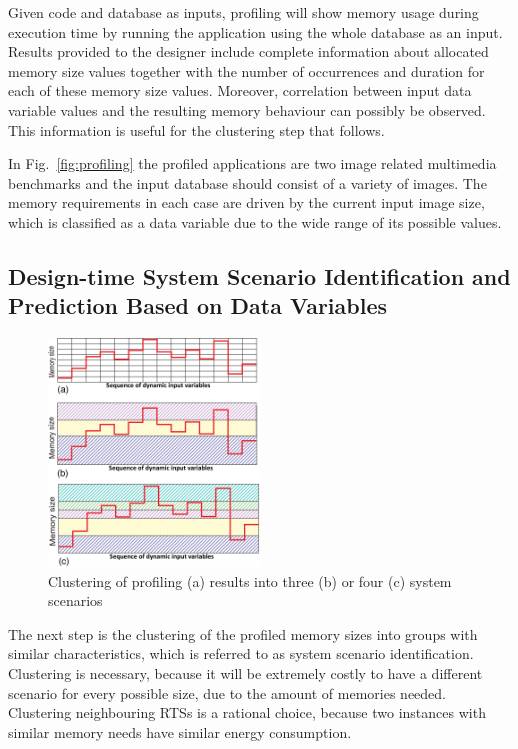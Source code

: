 \documentclass[a4paper,conference]{IEEEtran}
\begin{document}
Given code and database as inputs, profiling will show memory usage during execution time by running the application using the whole database as an input. Results provided to the designer include complete information about allocated memory size values together with the number of occurrences and duration for each of these memory size values. Moreover, correlation between input data variable values and the resulting memory behaviour can possibly be observed. This information is useful for the clustering step that follows. 

In Fig.~\ref{fig:profiling} the profiled applications are two image related multimedia benchmarks and the input database should consist of a variety of images. The memory requirements in each case are driven by the current input image size, which is classified as a data variable due to the wide range of its possible values. 

\subsection{Design-time System Scenario Identification and Prediction Based on Data Variables}

\begin{figure}[!t]
\centering
\includegraphics[width=0.50\textwidth]{Images/1Dclustering.eps}
\caption{Clustering of profiling (a) results into three (b) or four (c) system scenarios}
\label{fig:clustering}
\end{figure}

The next step is the clustering of the profiled memory sizes into groups with similar characteristics, which is referred to as system scenario identification. Clustering is necessary, because it will be extremely costly to have a different scenario for every possible size, due to the amount of memories needed. Clustering neighbouring RTSs is a rational choice, because two instances with similar memory needs have similar energy consumption. 
\end{document}
